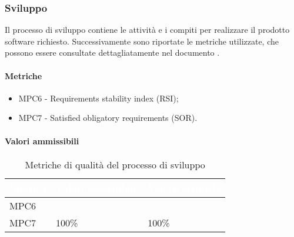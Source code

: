 \subsubsection{Sviluppo}
Il processo di sviluppo contiene le attività e i compiti per realizzare il prodotto software richiesto. Successivamente sono riportate le metriche utilizzate, che possono essere consultate dettagliatamente nel documento .

\paragraph{Metriche}
\begin{itemize}
	\item MPC6 - Requirements stability index (RSI);
	\item MPC7 - Satisfied obligatory requirements (SOR).
\end{itemize}


\paragraph{Valori ammissibili}
{
\renewcommand{\arraystretch}{1.5}
\centering
\begin{longtable}{C{2.5cm} C{7cm} C{4cm}}
\textcolor{white}{\textbf{Metrica}}&
\textcolor{white}{\textbf{Valori accettabile}}&
\textcolor{white}{\textbf{Valore ottimale}}\\	
\endhead
\endfoot
{}\caption{Metriche di qualità del processo di sviluppo}
\endlastfoot

MPC6 &   &  \\
MPC7 & 100\% & 100\%
\end{longtable}
}

